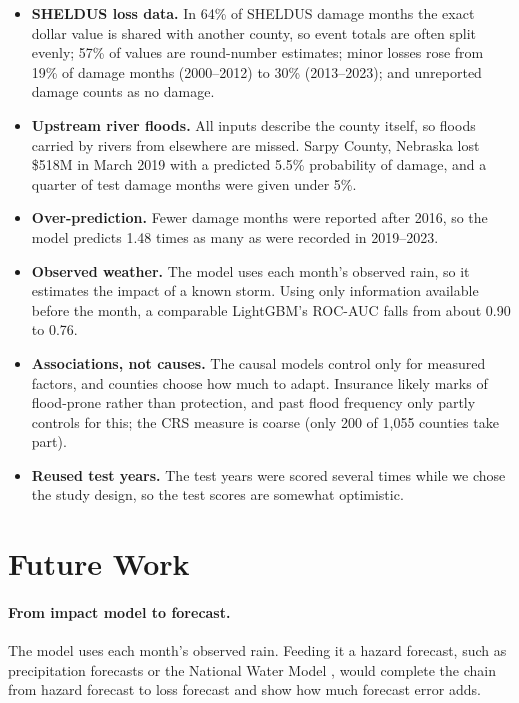 \documentclass[10pt,twocolumn]{article}
\begin{document}
\begin{itemize}
  \item \textbf{SHELDUS loss data.} In 64\% of SHELDUS damage months the exact dollar value is
        shared with another county, so event totals are often split evenly; 57\% of values are
        round-number estimates; minor losses rose from 19\% of damage months (2000--2012) to 30\%
        (2013--2023); and unreported damage counts as no damage.
  \item \textbf{Upstream river floods.} All inputs describe the county itself, so floods carried
        by rivers from elsewhere are missed. Sarpy County, Nebraska lost \$518M in March 2019 with
        a predicted 5.5\% probability of damage, and a quarter of test damage months were given
        under 5\%.
\item \textbf{Over-prediction.} Fewer damage months were reported after 2016, so the model
        predicts 1.48 times as many as were recorded in 2019--2023. 
  \item \textbf{Observed weather.} The model uses each month's observed rain, so it estimates the
        impact of a known storm. Using only information available before the month, a comparable
        LightGBM's ROC-AUC falls from about 0.90 to 0.76.
  \item \textbf{Associations, not causes.} The causal models control only for measured
        factors, and counties choose how much to adapt. Insurance likely marks of flood-prone  rather than protection, and past flood frequency only partly controls for this; the CRS measure is coarse (only 200
        of 1{,}055 counties take part).
\item \textbf{Reused test years.} The test years were scored several times while we chose the study design, so the test scores are somewhat optimistic.
\end{itemize}


\section{Future Work}
\label{sec:future}

\paragraph{From impact model to forecast.} The model uses each month's observed rain. Feeding it
a hazard forecast, such as precipitation forecasts or the National Water Model \citep{nwm2026}, would complete the
chain from hazard forecast to loss forecast \citep{merz2020} and show how much forecast error adds.
\end{document}
